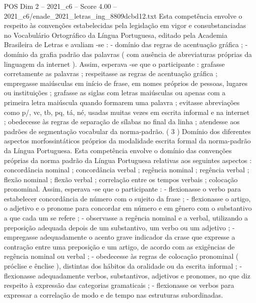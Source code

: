 \begin{textsample}{POS Dim 2 – 2021\_c6 – Score 4.00 – 2021\_c6/enade\_2021\_letras\_ing\_8809dcbd12.txt}
Esta competência envolve o respeito às convenções estabelecidas pela legislação em vigor e consubstanciadas no Vocabulário Ortográfico da Língua Portuguesa, editado pela Academia Brasileira de Letras e avaliam -se : - domínio das regras de acentuação gráfica ; - domínio da grafia padrão das palavras ( com ausência de abreviaturas próprias da linguagem da internet ).
Assim, esperava -se que o participante : grafasse corretamente as palavras ; respeitasse as regras de acentuação gráfica ; empregasse maiúsculas em início de frase, em nomes próprios de pessoas, lugares ou instituições ; grafasse as siglas com letras maiúsculas ou apenas com a primeira letra maiúscula quando formarem uma palavra ; evitasse abreviações como p/, vc, tb, pq, tá, né, usadas muitas vezes em escrita informal e na internet ; obedecesse às regras de separação de sílabas no final da linha ; atendesse aos padrões de segmentação vocabular da norma-padrão. ( 3 ) Domínio dos diferentes aspectos morfossintáticos próprios da modalidade escrita formal da norma-padrão da Língua Portuguesa.
Esta competência envolve o domínio das convenções próprias da norma padrão da Língua Portuguesa relativas aos seguintes aspectos : concordância nominal ; concordância verbal ; regência nominal ; regência verbal ; flexão nominal ; flexão verbal ; correlação entre os tempos verbais ; colocação pronominal.
Assim, esperava -se que o participante : - flexionasse o verbo para estabelecer concordância de número com o sujeito da frase ; - flexionasse o artigo, o adjetivo e o pronome para concordar em número e em gênero com o substantivo a que cada um se refere ; - observasse a regência nominal e a verbal, utilizando a preposição adequada depois de um substantivo, um verbo ou um adjetivo ; - empregasse adequadamente o acento grave indicador da crase que expresse a contração entre uma preposição e um artigo, de acordo com as exigências de regência nominal ou verbal ; - obedecesse às regras de colocação pronominal ( próclise e ênclise ), distintas dos hábitos da oralidade ou da escrita informal ; - flexionasse adequadamente verbos, substantivos, adjetivos e pronomes, no que diz respeito à expressão das categorias gramaticais ; - flexionasse os verbos para expressar a correlação de modo e de tempo nas estruturas subordinadas.

\end{textsample}
